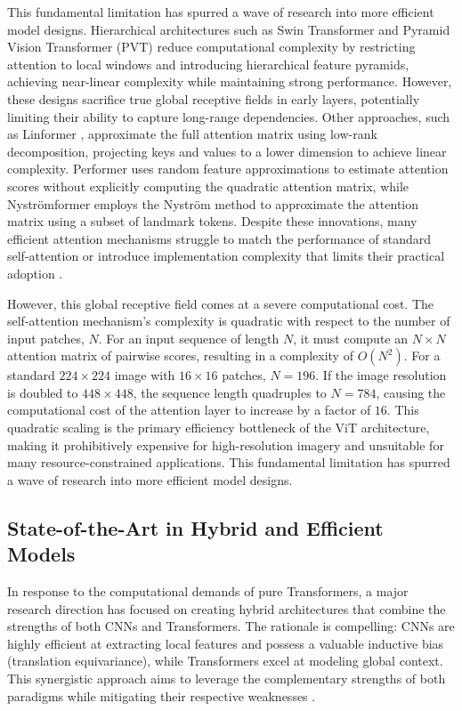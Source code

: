 \documentclass[12pt, a4paper]{article}
\begin{document}
This fundamental limitation has spurred a wave of research into more efficient model designs. Hierarchical architectures such as Swin Transformer \cite{liu2021swin} and Pyramid Vision Transformer (PVT) \cite{wang2021pyramid} reduce computational complexity by restricting attention to local windows and introducing hierarchical feature pyramids, achieving near-linear complexity while maintaining strong performance. However, these designs sacrifice true global receptive fields in early layers, potentially limiting their ability to capture long-range dependencies. Other approaches, such as Linformer \cite{wang2020linformer}, approximate the full attention matrix using low-rank decomposition, projecting keys and values to a lower dimension to achieve linear complexity. Performer \cite{choromanski2020rethinking} uses random feature approximations to estimate attention scores without explicitly computing the quadratic attention matrix, while Nystr\"{o}mformer \cite{xiong2021nystromformer} employs the Nystr\"{o}m method to approximate the attention matrix using a subset of landmark tokens. Despite these innovations, many efficient attention mechanisms struggle to match the performance of standard self-attention or introduce implementation complexity that limits their practical adoption \cite{tay2022efficient}.

However, this global receptive field comes at a severe computational cost. The self-attention mechanism's complexity is quadratic with respect to the number of input patches, $N$. For an input sequence of length $N$, it must compute an $N \times N$ attention matrix of pairwise scores, resulting in a complexity of $O(N^2)$. For a standard $224 \times 224$ image with $16 \times 16$ patches, $N=196$. If the image resolution is doubled to $448 \times 448$, the sequence length quadruples to $N=784$, causing the computational cost of the attention layer to increase by a factor of $16$. This quadratic scaling is the primary efficiency bottleneck of the ViT architecture, making it prohibitively expensive for high-resolution imagery and unsuitable for many resource-constrained applications. This fundamental limitation has spurred a wave of research into more efficient model designs.

\subsection{State-of-the-Art in Hybrid and Efficient Models}
\label{ssec:hybrid_efficient_models}

In response to the computational demands of pure Transformers, a major research direction has focused on creating hybrid architectures that combine the strengths of both CNNs and Transformers. The rationale is compelling: CNNs are highly efficient at extracting local features and possess a valuable inductive bias (translation equivariance), while Transformers excel at modeling global context. This synergistic approach aims to leverage the complementary strengths of both paradigms while mitigating their respective weaknesses \cite{trockman2023mimetic}.
\end{document}
